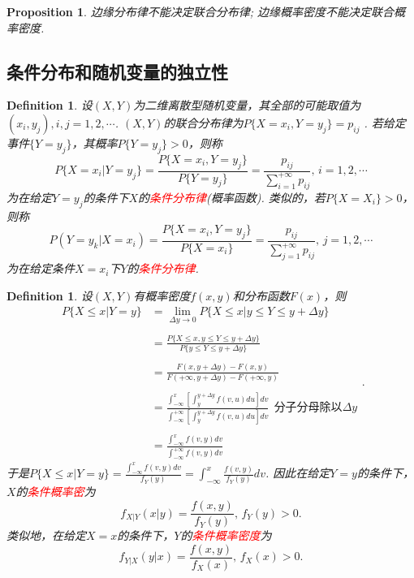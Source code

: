 \documentclass{article}
\newtheorem{proposition}[theorem]{Proposition}
\newtheorem{definition}[theorem]{Definition}
\newcommand{\redt}[1]{\textcolor{red}{#1}}
\begin{document}
\begin{proposition}
\rm 边缘分布律不能决定联合分布律; 边缘概率密度不能决定联合概率密度. 
\end{proposition}

\subsection{条件分布和随机变量的独立性}

\begin{definition}
\rm 设$(X,Y)$为二维离散型随机变量，其全部的可能取值为$(x_i,y_j), i,j=1,2,\cdots$. $(X,Y)$的联合分布律为$P\{X=x_i,Y=y_j\}=p_{ij}$ . 若给定事件$\{Y=y_j\}$，其概率$P\{Y=y_j\} > 0$，则称
$$
P\{X=x_i | Y=y_j\} = \frac{P\{X=x_i,Y=y_j\}}{P\{Y=y_j\}} = \frac{p_{ij}}{\sum\limits_{i=1}^{+\infty} p_{ij}}, \, i=1,2,\cdots 
$$
为在给定$Y=y_j$的条件下$X$的\redt{条件分布律}(概率函数). 类似的，若$P\{X=X_i\}>0$，则称
$$
P(Y=y_k|X=x_i) = \frac{P\{X=x_i,Y=y_j\}}{P\{X=x_i\}} = \frac{p_{ij}}{\sum\limits_{j=1}^{+\infty} p_{ij}}, \, j=1,2,\cdots
$$
为在给定条件$X=x_i$下$Y$的\redt{条件分布律}. 
\end{definition}

\begin{definition}
\rm 设$(X,Y)$有概率密度$f(x,y)$和分布函数$F(x)$，则
$$
\begin{array}{ll}
P\{X \leq x|Y = y\} &= \lim\limits_{\Delta y \to 0}P\{X \leq x|y \leq Y \leq y+\Delta y\} \\ \\
&= \frac{P\{X \leq x, y \leq Y \leq y+\Delta y\}}{P\{y \leq Y \leq y+\Delta y\}} \\ \\
&= \frac{F(x,y+\Delta y)-F(x,y)}{F(+\infty,y+\Delta y)-F(+\infty, y)} \\ \\
&= \frac{\int_{-\infty}^{x}\left[\int_{y}^{y +\Delta y}f(v,u)du\right]dv}{\int^{+\infty}_{-\infty} \left[\int_{y}^{y + \Delta y} f(v,u)du\right]dv} ~~ \text{分子分母除以$\Delta y$} \\ \\
&= \frac{\int_{-\infty}^{x}f(v,y)dv}{\int^{+\infty}_{-\infty} f(v,y)dv}
\end{array}.
$$
于是$P\{X \leq x|Y = y\}= \frac{\int_{-\infty}^{x}f(v,y)dv}{f_Y(y)} = \int_{-\infty}^{x}\frac{f(v,y)}{f_Y(y)}dv$. 因此在给定$Y=y$的条件下，$X$的\redt{条件概率密}为
$$
f_{X|Y}(x|y) = \frac{f(x,y)}{f_Y(y)}, \, f_Y(y) > 0.
$$
类似地，在给定$X=x$的条件下，$Y$的\redt{条件概率密度}为
$$
f_{Y|X}(y|x) = \frac{f(x,y)}{f_X(x)}, \, f_X(x) > 0.
$$
\end{definition}
\end{document}
